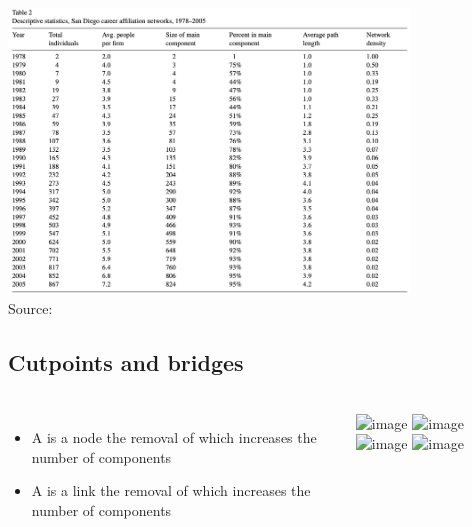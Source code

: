 \documentclass[8pt]{beamer}
\begin{document}

\begin{frame}[fragile]
\frametitle{\insertsection}
\framesubtitle{\insertsubsection}

\centering
\includegraphics[width = 0.8\textwidth]{network_emergence_table}\\
\tiny Source: \cite{Casper2007}

\end{frame}




\subsection{Cutpoints and bridges}

\begin{frame}
\frametitle{\insertsection}
\framesubtitle{\insertsubsection}

\begin{columns}
\begin{itemize}[<+->]
	\item <1,2,3,4> A {\color{blue}{cutpoint}} is a node the removal of which increases the number of components
	\item <3,4> A {\color{blue}{bridge}} is a link the removal of which increases the number of components 
\end{itemize}

\centering
\includegraphics<1>[width=5cm]{components2}
\includegraphics<2>[width=5cm]{cutpoint}
\includegraphics<3>[width=5cm]{components2}
\includegraphics<4>[width=5cm]{bridge}

\end{columns}

\end{frame}
\end{document}
